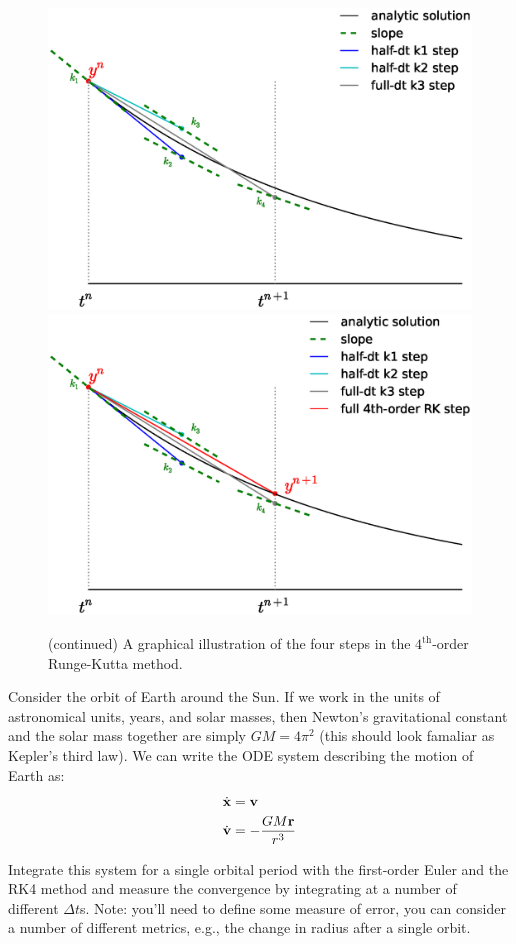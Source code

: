 \begin{figure}[t]
\ContinuedFloat
\centering
\includegraphics[width=0.65\linewidth]{rk4_k4.eps} \\
\includegraphics[width=0.7\linewidth]{rk4_final.eps} \\
%
\caption[$4^\mathrm{th}$-order Runge-Kutta continued] {\label{fig:rk}
  (continued) A graphical illustration of the four steps in the
  $4^\mathrm{th}$-order Runge-Kutta method.}
\end{figure}

\begin{exercise}
Consider the orbit of Earth around the Sun.  If we work in the units
of astronomical units, years, and solar masses, then Newton's gravitational
constant and the solar mass together are simply $G M = 4\pi^2$ (this
should look famaliar as Kepler's third law).  We 
can write the ODE system describing the motion of Earth as:
\begin{align}
\dot{\bf x} &= {\bf v} \\
\dot{\bf v} &= -\frac{G M {\bf r}}{r^3}
\end{align}

Integrate this system for a single orbital period with the first-order
Euler and the RK4 method and measure the convergence by integrating at
a number of different $\Delta t$s.  Note: you'll need to define some
measure of error, you can consider a number of different metrics, e.g.,
the change in radius after a single orbit.
\end{exercise}

